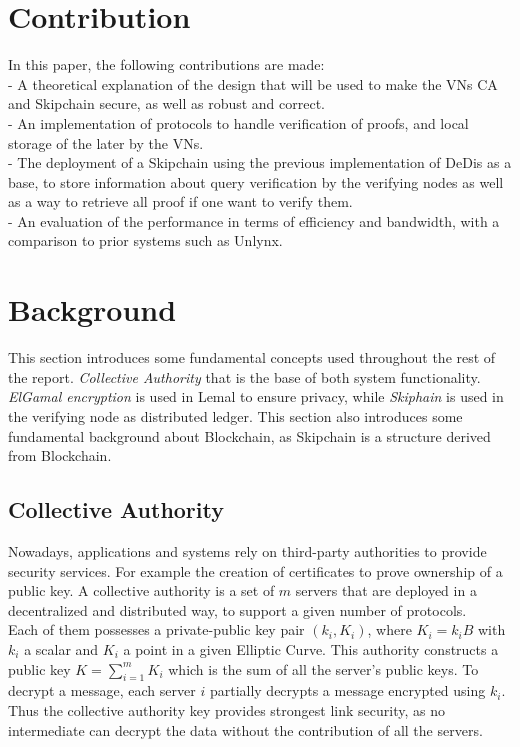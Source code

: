 \documentclass{article}
\begin{document}
\section{Contribution}
In this paper, the following contributions are made:\\


- A theoretical explanation of the design that will be used to make the VNs CA and Skipchain secure, as well as robust and correct.\\


- An implementation of protocols to handle verification of proofs, and local storage of the later by the VNs.\\


- The deployment of a Skipchain using the previous implementation of DeDis as a base, to store information about query verification by the verifying nodes as well as a way to retrieve all proof if one want to verify them.\\


- An evaluation of the performance in terms of efficiency and bandwidth, with a comparison to prior systems such as Unlynx.\\
\section{Background}
This section introduces some fundamental concepts used throughout the rest of the report. \textit{Collective Authority} that is the base of both system functionality. \textit{ElGamal encryption} is used in Lemal to ensure privacy, while \textit{Skiphain} is used in the verifying node as distributed ledger. This section also introduces some fundamental background about Blockchain, as Skipchain is a structure derived from Blockchain.

\subsection{Collective Authority}
Nowadays, applications and systems rely on third-party authorities to provide security services. For example the creation of certificates to prove ownership of a public key. A collective authority is a set of $m$  servers that are deployed in a decentralized and distributed way, to support a given number of protocols.\\
Each of them possesses a private-public key pair $(k_i,K_i)$, where $K_i = k_i B$ with $k_i$ a scalar and $K_i$ a point in a given Elliptic Curve. This authority constructs a public key $K = \sum_{i=1}^{m}{K_i}$ which is the sum of all the server's public keys. To decrypt a message, each server $i$ partially decrypts a message encrypted using $k_{i}$. Thus the collective authority key provides strongest link security, as no intermediate can decrypt the data without the contribution of all the servers.
\end{document}
